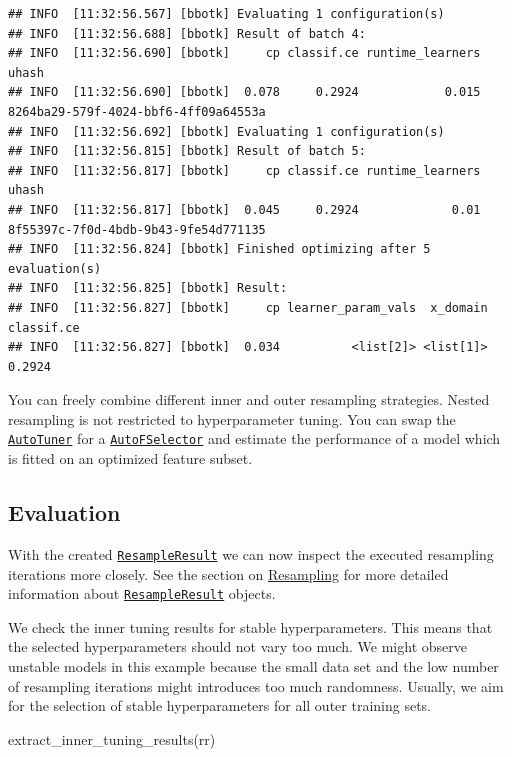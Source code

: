 \documentclass[
]{scrbook}
\newenvironment{Shaded}{\begin{snugshade}}{\end{snugshade}}
\newcommand{\FunctionTok}[1]{\textcolor[rgb]{0.00,0.00,0.00}{#1}}
\newcommand{\NormalTok}[1]{#1}
\renewenvironment{Shaded} {\begin{snugshade}\small} {\end{snugshade}}
\begin{document}
\begin{verbatim}
## INFO  [11:32:56.567] [bbotk] Evaluating 1 configuration(s) 
## INFO  [11:32:56.688] [bbotk] Result of batch 4: 
## INFO  [11:32:56.690] [bbotk]     cp classif.ce runtime_learners                                uhash 
## INFO  [11:32:56.690] [bbotk]  0.078     0.2924            0.015 8264ba29-579f-4024-bbf6-4ff09a64553a 
## INFO  [11:32:56.692] [bbotk] Evaluating 1 configuration(s) 
## INFO  [11:32:56.815] [bbotk] Result of batch 5: 
## INFO  [11:32:56.817] [bbotk]     cp classif.ce runtime_learners                                uhash 
## INFO  [11:32:56.817] [bbotk]  0.045     0.2924             0.01 8f55397c-7f0d-4bdb-9b43-9fe54d771135 
## INFO  [11:32:56.824] [bbotk] Finished optimizing after 5 evaluation(s) 
## INFO  [11:32:56.825] [bbotk] Result: 
## INFO  [11:32:56.827] [bbotk]     cp learner_param_vals  x_domain classif.ce 
## INFO  [11:32:56.827] [bbotk]  0.034          <list[2]> <list[1]>     0.2924
\end{verbatim}

You can freely combine different inner and outer resampling strategies.
Nested resampling is not restricted to hyperparameter tuning.
You can swap the \href{https://mlr3tuning.mlr-org.com/reference/AutoTuner.html}{\texttt{AutoTuner}} for a \href{https://mlr3fselect.mlr-org.com/reference/AutoFSelector.html}{\texttt{AutoFSelector}} and estimate the performance of a model which is fitted on an optimized feature subset.

\hypertarget{nested-resamp-eval}{%
\subsection{Evaluation}\label{nested-resamp-eval}}

With the created \href{https://mlr3.mlr-org.com/reference/ResampleResult.html}{\texttt{ResampleResult}} we can now inspect the executed resampling iterations more closely.
See the section on \protect\hyperlink{resampling}{Resampling} for more detailed information about \href{https://mlr3.mlr-org.com/reference/ResampleResult.html}{\texttt{ResampleResult}} objects.

We check the inner tuning results for stable hyperparameters.
This means that the selected hyperparameters should not vary too much.
We might observe unstable models in this example because the small data set and the low number of resampling iterations might introduces too much randomness.
Usually, we aim for the selection of stable hyperparameters for all outer training sets.

\begin{Shaded}
\begin{Highlighting}[]
\FunctionTok{extract\_inner\_tuning\_results}\NormalTok{(rr)}
\end{Highlighting}
\end{Shaded}
\end{document}
